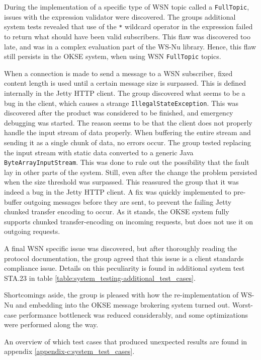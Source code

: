 During the implementation of a specific type of WSN topic called a \verb!FullTopic!, issues with the expression validator were discovered. The groups additional system tests revealed that use of the \verb!*! wildcard operator in the expression failed to return what should have been valid subscribers. This flaw was discovered too late, and was in a complex evaluation part of the WS-Nu library. Hence, this flaw still persists in the OKSE system, when using WSN \verb!FullTopic! topics.

When a connection is made to send a message to a WSN subscriber, fixed content length is used until a certain message size is surpassed. This is defined internally in the Jetty HTTP client. The group discovered what seems to be a bug in the client, which causes a strange \verb!IllegalStateException!. This was discovered after the product was considered to be finished, and emergency debugging was started. The reason seems to be that the client does not properly handle the input stream of data properly. When buffering the entire stream and sending it as a single chunk of data, no errors occur. The group tested replacing the input stream with static data converted to a generic Java \verb!ByteArrayInputStream!. This was done to rule out the possibility that the fault lay in other parts of the system. Still, even after the change the problem persisted when the size threshold was surpassed. This reassured the group that it was indeed a bug in the Jetty HTTP client. A fix was quickly implemented to pre-buffer outgoing messages before they are sent, to prevent the failing Jetty chunked transfer encoding to occur. As it stands, the OKSE system fully supports chunked transfer-encoding on incoming requests, but does not use it on outgoing requests.

A final WSN specific issue was discovered, but after thoroughly reading the protocol documentation, the group agreed that this issue is a client standards compliance issue. Details on this peculiarity is found in additional system test STA.23 in table \ref{table:system_testing-additional_test_cases}.

Shortcomings aside, the group is pleased with how the re-implementation of WS-Nu and embedding into the OKSE message brokering system turned out. Worst-case performance bottleneck was reduced considerably, and some optimizations were performed along the way.

An overview of which test cases that produced unexpected results are found in appendix \ref{appendix-c:system_test_cases}.

